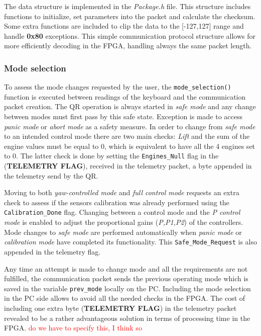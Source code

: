 \documentclass{article}
\newcommand\worries[1]{\textcolor{red}{#1}} %
\begin{document}
The data structure is implemented in the \emph{Package.h} file. This structure includes functions to initialize, set parameters into the packet and calculate the checksum. Some extra functions are included to clip the data to the [-127,127] range and handle \textbf{0x80} exceptions. This simple communication protocol structure allows for more efficiently decoding in the FPGA, handling always the same packet length.


\subsubsection{Mode selection}
\label{sec:modeselection}
To assess the mode changes requested by the user, the \texttt{mode\_selection()} function is executed between readings of the keyboard and the communication packet creation. The QR operation is always started in \textit{safe mode} and any change between modes must first pass by this safe state. Exception is made to access \textit{panic mode} or \textit{abort mode} as a safety measure. In order to change from \textit{safe mode} to an intended control mode there are two main checks: \textit{Lift} and the sum of the engine values must be equal to $0$, which is equivalent to have all the 4 engines set to $0$. The latter check is done by setting the \texttt{Engines\_Null} flag in the (\textbf{TELEMETRY FLAG}), received in the telemetry packet, a byte appended in the telemetry send by the QR. 

Moving to both \textit{yaw-controlled mode} and \textit{full control mode} requests an extra check to assess if the sensors calibration was already performed using the \texttt{Calibration\_Done} flag. Changing between a control mode and the \textit{P control mode} is enabled to adjust the proportional gains (\textit{P,P1,P2}) of the controllers. Mode changes to \textit{safe mode} are performed automatically when \textit{panic mode} or \textit{calibration mode} have completed its functionality. This \texttt{Safe\_Mode\_Request} is also appended in the telemetry flag. 

Any time an attempt is made to change mode and all the requirements are not fulfilled, the communication packet sends the previous operating mode which is saved in the variable \texttt{prev\_mode} locally on the PC. Including the mode selection in the PC side allows to avoid all the needed checks in the FPGA. The cost of including one extra byte (\textbf{TELEMETRY FLAG}) in the telemetry packet revealed to be a rather advantageous solution in terms of processing time in the FPGA. \worries{do we have to specify this, I think so}
\end{document}
